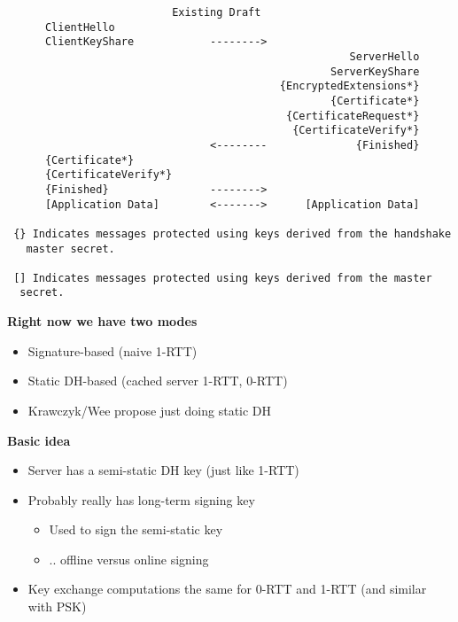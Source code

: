 \documentclass[helvetica]{seminar}
\newcommand{\heading}[1]{%
  \begin{center} 
    \large\bf 
    #1 
  \end{center} 
  \vspace{.4 in}}
\begin{document}
\centerslidesfalse 

\begin{slide}
\begin{footnotesize}
\begin{verbatim}
                          Existing Draft
      ClientHello
      ClientKeyShare            -------->
                                                      ServerHello
                                                   ServerKeyShare
                                           {EncryptedExtensions*}
                                                   {Certificate*}
                                            {CertificateRequest*}
                                             {CertificateVerify*}
                                <--------              {Finished}
      {Certificate*}
      {CertificateVerify*}
      {Finished}                -------->
      [Application Data]        <------->      [Application Data]

 {} Indicates messages protected using keys derived from the handshake
   master secret.

 [] Indicates messages protected using keys derived from the master
  secret.
\end{verbatim}
\end{footnotesize}
\end{slide}

\begin{slide}
\heading{Right now we have two modes}

\begin{itemize}
\item Signature-based (naive 1-RTT)
\item Static DH-based (cached server 1-RTT, 0-RTT)
\item Krawczyk/Wee propose just doing static DH
\end{itemize}
\end{slide}


\begin{slide}
\heading{Basic idea}

\begin{itemize}
\item Server has a semi-static DH key (just like 1-RTT)
\item Probably really has long-term signing key
  \begin{itemize}
  \item Used to sign the semi-static key
  \item .. offline versus online signing
  \end{itemize}

\item Key exchange computations the same for 0-RTT and 1-RTT (and similar with PSK)
\end{itemize}

\end{slide}
\end{document}
